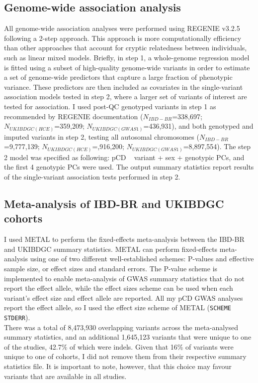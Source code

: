 \subsection{Genome-wide association analysis}
All genome-wide association analyses were performed using REGENIE v3.2.5 \cite{Mbatchou2021-qm} following a 2-step approach. This approach is more computationally efficiency than other approaches that account for cryptic relatedness between individuals, such as linear mixed models. Briefly, in step 1, a whole-genome regression model is fitted using a subset of high-quality genome-wide variants in order to estimate a set of genome-wide predictors that capture a large fraction of phenotypic variance. These predictors are then included as covariates in the single-variant association models tested in step 2, where a larger set of variants of interest are tested for association. I used post-QC genotyped variants in step 1 as recommended by REGENIE documentation ($N_{IBD-BR}$=338,697; $N_{UKIBDGC(HCE)}$=359,209; $N_{UKIBDGC(GWAS1)}$=436,931), and both genotyped and imputed variants in step 2, testing all autosomal chromosomes ($N_{IBD-BR}$=9,777,139; $N_{UKIBDGC(HCE)}$=,916,200; $N_{UKIBDGC(GWAS1)}$=8,897,554). The step 2 model was specified as following: pCD ~ variant + sex + genotypic PCs, and the first 4 genotypic PCs were used. The output summary statistics report results of the  single-variant association tests performed in step 2.

\subsection{Meta-analysis of IBD-BR and UKIBDGC cohorts}
I used METAL to perform the fixed-effects meta-analysis between the IBD-BR and UKIBDGC summary statistics.  METAL can perform fixed-effects meta-analysis using one of two different well-established schemes: P-values and effective sample size, or effect sizes and standard errors. The P-value scheme is implemented to enable meta-analysis of GWAS summary statistics that do not report the effect allele, while the effect sizes scheme can be used when each variant's effect size and effect allele are reported. All my pCD GWAS analyses report the effect allele, so I used the effect size scheme of METAL (\Verb+SCHEME STDERR+). \\

There was a total of 8,473,930 overlapping variants across the meta-analysed summary statistics, and an additional 1,645,123 variants that were unique to one of the studies, 42.7\% of which were indels. Given that 16\% of variants were unique to one of cohorts, I did not remove them from their respective summary statistics file. It is important to note, however, that this choice may favour variants that are available in all studies. 


